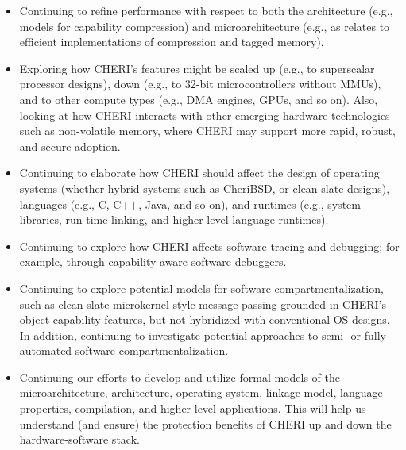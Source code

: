 \begin{itemize}
\item
Continuing to refine performance with respect to both the architecture (e.g.,
models for capability compression) and microarchitecture (e.g., as relates to
efficient implementations of compression and tagged memory).

\item
Exploring how CHERI's features might be scaled up (e.g., to superscalar
processor designs), down (e.g., to 32-bit microcontrollers without MMUs), and
to other compute types (e.g., DMA engines, GPUs, and so on).
Also, looking at how CHERI interacts with other emerging hardware technologies
such as non-volatile memory, where CHERI may support more rapid, robust, and
secure adoption.

\item
Continuing to elaborate how CHERI should affect the design of operating
systems (whether hybrid systems such as CheriBSD, or clean-slate designs),
languages (e.g., C, C++, Java, and so on), and runtimes (e.g., system
libraries, run-time linking, and higher-level language runtimes).

\item
Continuing to explore how CHERI affects software tracing and debugging; for
example, through capability-aware software debuggers.

\item
Continuing to explore potential models for software compartmentalization, such
as clean-slate microkernel-style message passing grounded in CHERI's
object-capability features, but not hybridized with conventional OS designs.
In addition, continuing to investigate potential approaches to semi- or
fully automated software compartmentalization.

\item
Continuing our efforts to develop and utilize formal models of the
microarchitecture, architecture, operating system, linkage model, language
properties, compilation, and higher-level applications.
This will help us understand (and ensure) the protection benefits of CHERI up
and down the hardware-software stack.
\end{itemize}
